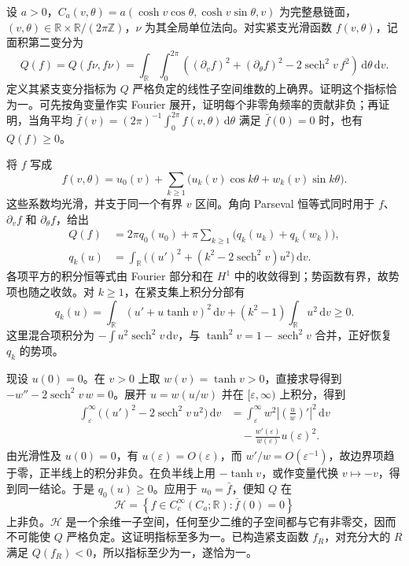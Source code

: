 \begin{exercise}\label{g3:ex:catenoid-unstable-test}
	设 \(a>0\)，\(C_a(v,\theta)=a(\cosh v\cos\theta,\cosh v\sin\theta,v)\) 为完整悬链面，\((v,\theta)\in\mathbb R\times\mathbb R/(2\pi\mathbb Z)\)，\(\nu\) 为其全局单位法向。对实紧支光滑函数 \(f(v,\theta)\)，记面积第二变分为
	\[
		Q(f)=Q(f\nu,f\nu)
		=\int_{\mathbb R}\int_0^{2\pi}
		\left((\partial_vf)^2+(\partial_\theta f)^2
		-2\operatorname{sech}^2v\,f^2\right)\,\mathrm d\theta\,\mathrm dv.
	\]
	定义其紧支变分指标为 \(Q\) 严格负定的线性子空间维数的上确界。证明这个指标恰为一。可先按角变量作实 Fourier 展开，证明每个非零角频率的贡献非负；再证明，当角平均 \(\bar f(v)=(2\pi)^{-1}\int_0^{2\pi}f(v,\theta)\,\mathrm d\theta\) 满足 \(\bar f(0)=0\) 时，也有 \(Q(f)\ge0\)。
\end{exercise}
\begin{solution}
	将 \(f\) 写成
	\[
		f(v,\theta)=u_0(v)+\sum_{k\ge1}
		\bigl(u_k(v)\cos k\theta+w_k(v)\sin k\theta\bigr).
	\]
	这些系数均光滑，并支于同一个有界 \(v\) 区间。角向 Parseval 恒等式同时用于 \(f\)、\(\partial_vf\) 和 \(\partial_\theta f\)，给出
	\[
		\begin{aligned}
			Q(f)&=2\pi q_0(u_0)+\pi\sum_{k\ge1}
			\bigl(q_k(u_k)+q_k(w_k)\bigr),\\
			q_k(u)&=\int_{\mathbb R}
			\bigl((u')^2+(k^2-2\operatorname{sech}^2v)u^2\bigr)\,\mathrm dv.
		\end{aligned}
	\]
	各项平方的积分恒等式由 Fourier 部分和在 \(H^1\) 中的收敛得到；势函数有界，故势项也随之收敛。对 \(k\ge1\)，在紧支集上积分分部有
	\[
		q_k(u)=\int_{\mathbb R}(u'+u\tanh v)^2\,\mathrm dv
		+(k^2-1)\int_{\mathbb R}u^2\,\mathrm dv\ge0.
	\]
	这里混合项积分为 \(-\int u^2\operatorname{sech}^2v\,\mathrm dv\)，与 \(\tanh^2v=1-\operatorname{sech}^2v\) 合并，正好恢复 \(q_k\) 的势项。

	现设 \(u(0)=0\)。在 \(v>0\) 上取 \(w(v)=\tanh v>0\)，直接求导得到 \(-w''-2\operatorname{sech}^2v\,w=0\)。展开 \(u=w(u/w)\) 并在 \([\varepsilon,\infty)\) 上积分，得到
	\[
		\begin{aligned}
			\int_\varepsilon^\infty\bigl((u')^2-2\operatorname{sech}^2v\,u^2\bigr)\,\mathrm dv
			&=\int_\varepsilon^\infty w^2\left|\left(\frac u w\right)'\right|^2\,\mathrm dv\\
			&\quad-\frac{w'(\varepsilon)}{w(\varepsilon)}u(\varepsilon)^2.
		\end{aligned}
	\]
	由光滑性及 \(u(0)=0\)，有 \(u(\varepsilon)=O(\varepsilon)\)，而 \(w'/w=O(\varepsilon^{-1})\)，故边界项趋于零，正半线上的积分非负。在负半线上用 \(-\tanh v\)，或作变量代换 \(v\mapsto-v\)，得到同一结论。于是 \(q_0(u)\ge0\)。应用于 \(u_0=\bar f\)，便知 \(Q\) 在
	\[
		\mathcal H=\left\{f\in C_c^\infty(C_a;\mathbb R):\bar f(0)=0\right\}
	\]
	上非负。\(\mathcal H\) 是一个余维一子空间，任何至少二维的子空间都与它有非零交，因而不可能使 \(Q\) 严格负定。这证明指标至多为一。已构造紧支函数 \(f_R\)，对充分大的 \(R\) 满足 \(Q(f_R)<0\)，所以指标至少为一，遂恰为一。
\end{solution}

